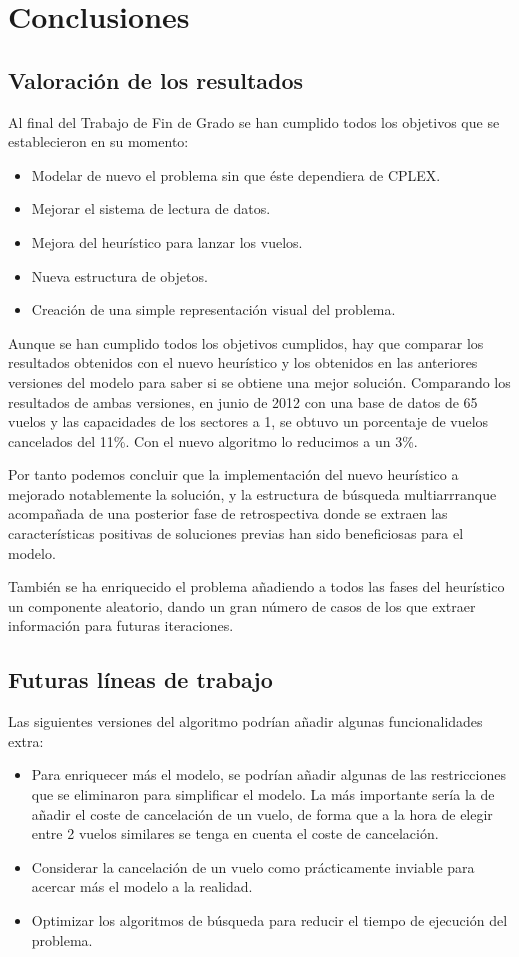 \chapter{Conclusiones}
\label{conclusiones}
\section{Valoración de los resultados}
Al final del Trabajo de Fin de Grado se han cumplido todos los objetivos que se establecieron en su momento:
\begin{itemize}
	\item Modelar de nuevo el problema sin que éste dependiera de CPLEX.
	\item Mejorar el sistema de lectura de datos. 
	\item Mejora del heurístico para lanzar los vuelos.
	\item Nueva estructura de objetos.
	\item Creación de una simple representación visual del problema.
\end{itemize}
Aunque se han cumplido todos los objetivos cumplidos, hay que comparar los resultados obtenidos con el nuevo heurístico y los obtenidos en las anteriores versiones del modelo para saber si se obtiene una mejor solución. Comparando los resultados de ambas versiones, en junio de 2012 con una base de datos de 65 vuelos y las capacidades de los sectores a 1, se obtuvo un porcentaje de vuelos cancelados del 11\%. Con el nuevo algoritmo lo reducimos a un 3\%.

Por tanto podemos concluir que la implementación del nuevo heurístico a mejorado notablemente la solución, y la estructura de búsqueda multiarrranque acompañada de una posterior fase de retrospectiva donde se extraen las características positivas de soluciones previas han sido beneficiosas para el modelo.

También se ha enriquecido el problema añadiendo a todos las fases del heurístico un componente aleatorio, dando un gran número de casos de los que extraer información para futuras iteraciones. 
\clearpage
\section{Futuras líneas de trabajo}
Las siguientes versiones del algoritmo podrían añadir algunas funcionalidades extra:
\begin{itemize}
	\item Para enriquecer más el modelo, se podrían añadir algunas de las restricciones que se eliminaron para simplificar el modelo. La más importante sería la de añadir el coste de cancelación de un vuelo, de forma que a la hora de elegir entre 2 vuelos similares se tenga en cuenta el coste de cancelación.
	\item Considerar la cancelación de un vuelo como prácticamente inviable para acercar más el modelo a la realidad.
	\item Optimizar los algoritmos de búsqueda para reducir el tiempo de ejecución del problema.
\end{itemize}



